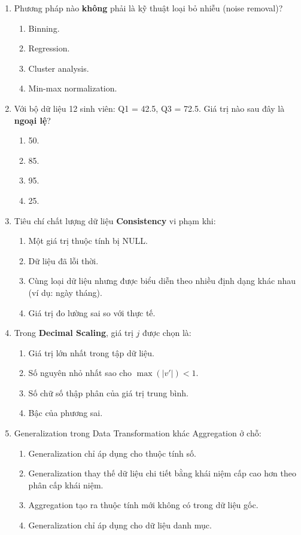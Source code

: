 \documentclass[10pt]{article}
\begin{document}
\begin{enumerate}[leftmargin=*, label=\textbf{Câu \arabic*.}]
    \item Phương pháp nào \textbf{không} phải là kỹ thuật loại bỏ nhiễu (noise removal)?
    \begin{enumerate}[label=\Alph*.]
        \item Binning.
        \item Regression.
        \item Cluster analysis.
        \item Min-max normalization.
    \end{enumerate}

    \item Với bộ dữ liệu 12 sinh viên: Q1 = 42.5, Q3 = 72.5. Giá trị nào sau đây là \textbf{ngoại lệ}?
    \begin{enumerate}[label=\Alph*.]
        \item 50.
        \item 85.
        \item 95.
        \item 25.
    \end{enumerate}

    \item Tiêu chí chất lượng dữ liệu \textbf{Consistency} vi phạm khi:
    \begin{enumerate}[label=\Alph*.]
        \item Một giá trị thuộc tính bị NULL.
        \item Dữ liệu đã lỗi thời.
        \item Cùng loại dữ liệu nhưng được biểu diễn theo nhiều định dạng khác nhau (ví dụ: ngày tháng).
        \item Giá trị đo lường sai so với thực tế.
    \end{enumerate}

    \item Trong \textbf{Decimal Scaling}, giá trị $j$ được chọn là:
    \begin{enumerate}[label=\Alph*.]
        \item Giá trị lớn nhất trong tập dữ liệu.
        \item Số nguyên nhỏ nhất sao cho $\max(|v'|) < 1$.
        \item Số chữ số thập phân của giá trị trung bình.
        \item Bậc của phương sai.
    \end{enumerate}

    \item Generalization trong Data Transformation khác Aggregation ở chỗ:
    \begin{enumerate}[label=\Alph*.]
        \item Generalization chỉ áp dụng cho thuộc tính số.
        \item Generalization thay thế dữ liệu chi tiết bằng khái niệm cấp cao hơn theo phân cấp khái niệm.
        \item Aggregation tạo ra thuộc tính mới không có trong dữ liệu gốc.
        \item Generalization chỉ áp dụng cho dữ liệu danh mục.
    \end{enumerate}


\end{enumerate}
\end{document}
